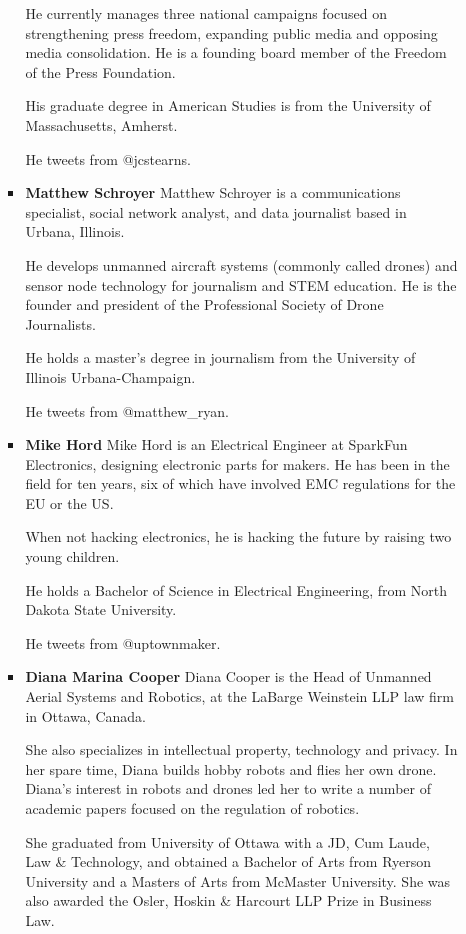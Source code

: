 \begin{itemize}
\begin{itemized}
\begin{itemize}
\begin{itemize}
He currently manages three national campaigns focused on strengthening
press freedom, expanding public media and opposing media consolidation.
He is a founding board member of the Freedom of the Press Foundation.

His graduate degree in American Studies is from the University of
Massachusetts, Amherst.

He tweets from @jcstearns.


\item \textbf{Matthew Schroyer}
Matthew Schroyer is a communications specialist, social network analyst,
and data journalist based in Urbana, Illinois.

He develops unmanned aircraft systems (commonly called drones) and sensor
node technology for journalism and STEM education. He is the founder
and president of the Professional Society of Drone Journalists.

He holds a master's degree in journalism from the University of Illinois
Urbana-Champaign.

He tweets from @matthew_ryan.


\item \textbf{Mike Hord}
Mike Hord is an Electrical Engineer at SparkFun Electronics, designing
electronic parts for makers. He has been in the field for ten years, six of
which have involved EMC regulations for the EU or the US.

When not hacking electronics, he is hacking the future by raising two
young children.

He holds a Bachelor of Science in Electrical Engineering, from North
Dakota State University.

He tweets from @uptownmaker.


\item \textbf{Diana Marina Cooper}
Diana Cooper is the Head of Unmanned Aerial Systems and Robotics, at the
LaBarge Weinstein LLP law firm in Ottawa, Canada.

She also specializes in intellectual property, technology and privacy. In her
spare time, Diana builds hobby robots and flies her own drone. Diana's
interest in robots and drones led her to write a number of academic papers
focused on the regulation of robotics.

She graduated from University of Ottawa with a JD, Cum Laude, Law &
Technology, and obtained a Bachelor of Arts from Ryerson University and a
Masters of Arts from McMaster University. She was also awarded the Osler,
Hoskin & Harcourt LLP Prize in Business Law.


\end{itemize}
\end{itemize}
\end{itemized}
\end{itemize}
